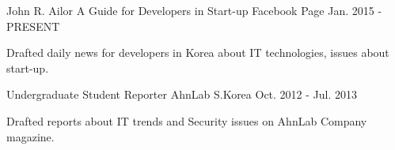 \begin{cventries}
  \cventry
    {John R. Ailor}
    {A Guide for Developers in Start-up}
    {Facebook Page}
    {Jan. 2015 - PRESENT}
    {
      \begin{cvitems}
        \item {Drafted daily news for developers in Korea about IT technologies, issues about start-up.}
      \end{cvitems}
    }
  \cventry
    {Undergraduate Student Reporter}
    {AhnLab}
    {S.Korea}
    {Oct. 2012 - Jul. 2013}
    {
      \begin{cvitems}
        \item {Drafted reports about IT trends and Security issues on AhnLab Company magazine.}
      \end{cvitems}
    }
\end{cventries}
